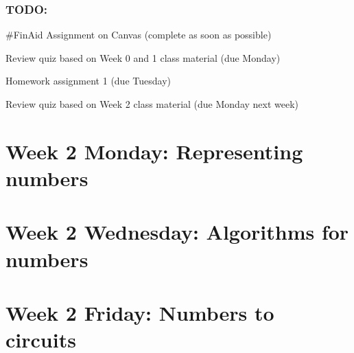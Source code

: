 \subsubsection*{TODO:}
\begin{list}
   {\itemsep2pt}
   \item \#FinAid Assignment on Canvas (complete as soon as possible) 
   \item Review quiz based on Week 0 and 1 class material (due Monday)
   \item Homework assignment 1 (due Tuesday)
   \item Review quiz based on Week 2 class material (due Monday next week)
\end{list}

\newpage




\section*{Week 2 Monday: Representing numbers}


\vfill
\newpage



\vfill
\newpage

\vfill


\newpage
\section*{Week 2 Wednesday: Algorithms for numbers}




%

\newpage
\section*{Week 2 Friday: Numbers to circuits}


\newpage

\vfill
\vfill



\vfill

\vfill
\newpage

